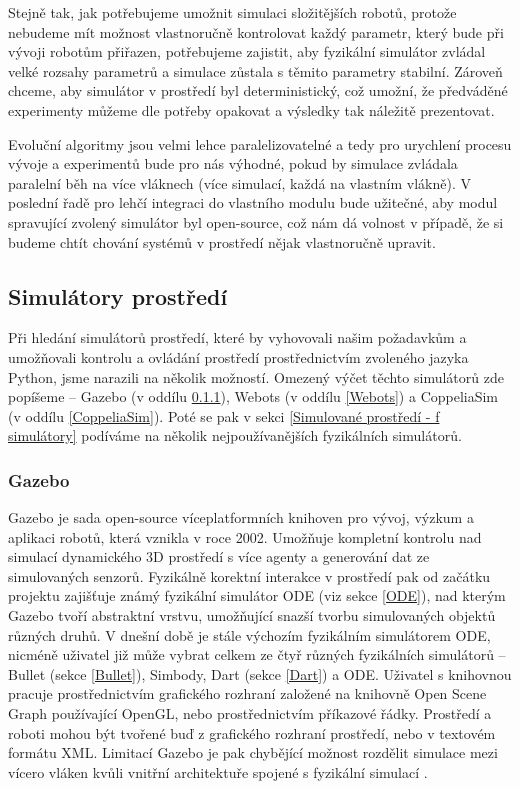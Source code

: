 Stejně tak, jak potřebujeme umožnit simulaci složitějších robotů, protože
nebudeme mít možnost vlastnoručně kontrolovat každý parametr, který bude při
vývoji robotům přiřazen, potřebujeme zajistit, aby fyzikální simulátor zvládal
velké rozsahy parametrů a simulace zůstala s těmito parametry stabilní. Zároveň
chceme, aby simulátor v prostředí byl deterministický, což umožní, že
předváděné experimenty můžeme dle potřeby opakovat a výsledky tak náležitě
prezentovat. 

Evoluční algoritmy jsou velmi lehce paralelizovatelné a tedy pro
urychlení procesu vývoje a experimentů bude pro nás výhodné, pokud by simulace
zvládala paralelní běh na více vláknech (více simulací, každá na vlastním
vlákně). V poslední řadě pro lehčí integraci do vlastního modulu bude užitečné,
aby modul spravující zvolený simulátor byl open-source, což nám dá volnost v
případě, že si budeme chtít chování systémů v prostředí nějak vlastnoručně
upravit.

\subsection{Simulátory prostředí}

Při hledání simulátorů prostředí, které by vyhovovali našim požadavkům a
umožňovali kontrolu a ovládání prostředí prostřednictvím zvoleného jazyka
Python, jsme narazili na několik možností. Omezený výčet těchto simulátorů zde
popíšeme -- Gazebo (v oddílu \ref{Gazebo}), Webots (v oddílu \ref{Webots}) a
CoppeliaSim (v oddílu \ref{CoppeliaSim}). Poté se pak v sekci \ref{Simulované
prostředí - f simulátory} podíváme na několik
nejpoužívanějších fyzikálních simulátorů.

\subsubsection{Gazebo} \label{Gazebo}
Gazebo \citep{gazeborobotics} je sada open-source víceplatformních knihoven pro
vývoj, výzkum a aplikaci robotů, která vznikla v roce 2002. Umožňuje kompletní
kontrolu nad simulací dynamického 3D prostředí s více agenty a generování dat
ze simulovaných senzorů. Fyzikálně korektní interakce v prostředí pak od
začátku projektu zajišťuje známý fyzikální simulátor ODE (viz sekce \ref{ODE}),
nad kterým Gazebo tvoří abstraktní vrstvu, umožňující snazší tvorbu
simulovaných objektů různých druhů. V dnešní době je stále výchozím fyzikálním
simulátorem ODE, nicméně uživatel již může vybrat celkem ze čtyř různých
fyzikálních simulátorů -- Bullet (sekce \ref{Bullet}), Simbody, Dart (sekce
\ref{Dart}) a ODE. Uživatel s knihovnou pracuje prostřednictvím grafického
rozhraní založené na knihovně Open Scene Graph používající OpenGL, nebo
prostřednictvím příkazové řádky. Prostředí a roboti mohou být tvořené buď z
grafického rozhraní prostředí, nebo v textovém formátu XML. Limitací Gazebo je
pak chybějící možnost rozdělit simulace mezi vícero vláken kvůli vnitřní
architektuře spojené s fyzikální simulací \citep{koenig2004design}. 

